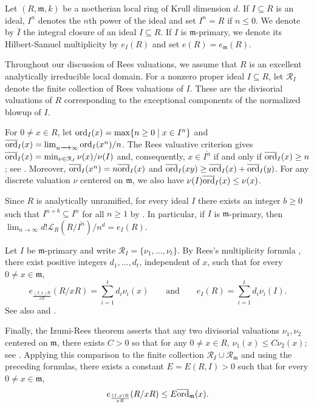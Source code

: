 \documentclass[12pt]{amsart}
\numberwithin{equation}{theorem}
\theoremstyle{plain}
\newcommand{\fm}{\mathfrak{m}}
\begin{document}
Let $(R,\fm,k)$ be a noetherian local ring of Krull dimension $d$. If $I\subseteq R$ is an ideal, $I^n$ denotes the $n$th power of the ideal and set $I^n=R$ if $n\leq 0$. We denote by $\overline{I}$ the integral closure of an ideal $I\subseteq R$. If $I$ is $\fm$-primary, we denote its Hilbert-Samuel multiplicity by $e_I(R)$ and set $e(R)=e_{\fm}(R)$.

Throughout our discussion of Rees valuations, we assume that $R$ is an excellent analytically irreducible local domain. For a nonzero proper ideal $I\subseteq R$, let $\mathcal{R}_I$ denote the finite collection of Rees valuations of $I$. These are the divisorial valuations of $R$ corresponding to the exceptional components of the normalized blowup of $I$.

For $0\not=x\in R$, let $\operatorname{{ord}}_I(x)=\max\{n\geq 0\mid x\in I^n\}$ and $\overline{\operatorname{{ord}}}_I(x)=\lim_{n\xrightarrow{\ \ }\infty}\operatorname{{ord}}_I(x^n)/n$. The Rees valuative criterion gives $\overline{\operatorname{{ord}}}_I(x)=\min_{\nu\in\mathcal{R}_I}\nu(x)/\nu(I)$ and, consequently, $x\in\overline{I^n}$ if and only if $\overline{\operatorname{{ord}}}_I(x)\geq n$; see \cite[Chapter~10]{HunekeSwanson2006}. Moreover, $\overline{\operatorname{{ord}}}_I(x^n)=n\overline{\operatorname{{ord}}}_I(x)$ and $\overline{\operatorname{{ord}}}_I(xy)\geq\overline{\operatorname{{ord}}}_I(x)+\overline{\operatorname{{ord}}}_I(y)$. For any discrete valuation $\nu$ centered on $\fm$, we also have $\nu(I)\overline{\operatorname{{ord}}}_{I}(x)\leq\nu(x)$.

Since $R$ is analytically unramified, for every ideal $I$ there exists an integer $b\geq 0$ such that $\overline{I^{n+b}}\subseteq I^n$ for all $n\geq 1$ by \cite[Theorem~9.1.2]{HunekeSwanson2006}. In particular, if $I$ is $\fm$-primary, then $\lim_{n\to\infty}d!\mathcal{L}_R(R/\overline{I^n})/n^d=e_I(R)$.

Let $I$ be $\fm$-primary and write $\mathcal{R}_I=\{\nu_1,\ldots,\nu_t\}$. By Rees's multiplicity formula \cite{Rees1961}, there exist positive integers $d_1,\ldots,d_t$, independent of $x$, such that for every $0\not=x\in\fm$,
\[
    e_{\frac{(I,x)R}{xR}}(R/xR)=\sum_{i=1}^t d_i\nu_i(x)
    \qquad\text{and}\qquad
    e_I(R)=\sum_{i=1}^t d_i\nu_i(I).
\]
See also \cite[Corollary~2.9]{Polstra2026} and \cite[Theorem~1.1]{CutkoskyMontano2025}.

Finally, the Izumi-Rees theorem asserts that any two divisorial valuations $\nu_1,\nu_2$ centered on $\fm$, there exists $C>0$ so that for any $0\not=x\in R$, $\nu_1(x)\leq C\nu_2(x)$; see \cite{Rees1989}. Applying this comparison to the finite collection $\mathcal{R}_I\cup\mathcal{R}_{\fm}$ and using the preceding formulas, there exists a constant $E=E(R,I)>0$ such that for every $0\not=x\in\fm$, 
\[
e_{\frac{(I,x)R}{xR}}(R/xR)\leq E\overline{\ord}_{\fm}(x).
\]
\end{document}
